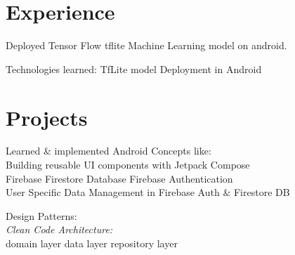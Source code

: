 \documentclass[]{deedy-resume-openfont}
\begin{document}
\begin{minipage}[t]{0.66\textwidth} 


\section{Experience}

\vspace{\topsep} %
\begin{tightemize}
\item Deployed Tensor Flow tflite Machine Learning model on android.
\item Technologies learned: TfLite model Deployment in Android
\end{tightemize}
\sectionsep







\section{Projects}

\href{}{}
\begin{tightemize}
\item Learned \& implemented Android Concepts like: \\
\quad \textbullet{} Building reusable UI components with Jetpack Compose \\ 
\quad \textbullet{} Firebase Firestore Database \textbullet{} Firebase Authentication \\ 
\quad \textbullet{} User Specific Data Management in Firebase Auth \& Firestore DB

\item Design Patterns: \\
\quad \textit{Clean Code Architecture:} \\
\quad \quad \textbullet{} domain layer \textbullet{} data layer \textbullet{} repository layer \\
\end{tightemize}
\sectionsep


\end{minipage}
\end{document}
